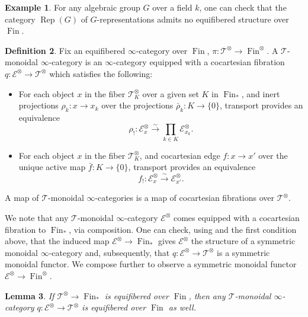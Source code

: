 \documentclass[reqno]{amsart}
\newtheorem{lemma}{Lemma}[section]
\theoremstyle{definition}
\newtheorem{example}[lemma]{Example}
\newtheorem{definition}[lemma]{Definition}
\newcommand{\msc}[1]{\mathscr{#1}}
\newcommand{\opn}[1]{\operatorname{#1}}
\newcommand{\ot}{\otimes}
\DeclareMathOperator{\Fin}{Fin}
\renewcommand{\1}{\mathbf{1}}
\begin{document}
\begin{example}
For any algebraic group $G$ over a field $k$, one can check that the category $\opn{Rep}(G)$ of $G$-representations admits no equifibered structure over $\Fin$.
\end{example}

\begin{definition}\label{def:T_mon}
Fix an equifibered $\infty$-category over $\Fin$, $\pi:\msc{T}^{\ot}\to \Fin^{\ot}$. A $\msc{T}$-monoidal $\infty$-category is an $\infty$-category equipped with a cocartesian fibration $q:\msc{E}^{\ot}\to\msc{T}^{\ot}$ which satisfies the following:
\begin{itemize}
\item For each object $x$ in the fiber $\msc{T}^{\ot}_K$ over a given set $K$ in $\opn{Fin}_{\ast}$, and inert projections $\rho_k:x\to x_k$ over the projections $\bar{\rho}_k:K\to \{0\}$, transport provides an equivalence
\[
\rho_!:\msc{E}^{\ot}_x\overset{\sim}\to \prod_{k\in K} \msc{E}^{\ot}_{x_k}.
\]\vspace{1mm}
\item For each object $x$ in the fiber $\msc{T}^{\ot}_K$, and cocartesian edge $f:x\to x'$ over the unique active map $\bar{f}:K\to \{0\}$, transport provides an equivalence
\[
f_!:\msc{E}^{\ot}_x\overset{\sim}\to \msc{E}^{\ot}_{x'}.
\]
\end{itemize}
A map of $\msc{T}$-monoidal $\infty$-categories is a map of cocartesian fibrations over $\msc{T}^{\ot}$.
\end{definition}

We note that any $\msc{T}$-monoidal $\infty$-category $\msc{E}^{\ot}$ comes equipped with a cocartesian fibration to $\Fin_{\ast}$, via composition. One can check, using \cite[\href{https://kerodon.net/tag/023M}{023M}]{kerodon} and the first condition above, that the induced map $\msc{E}^{\ot}\to \Fin_{\ast}$ gives $\msc{E}^{\ot}$ the structure of a symmetric monoidal $\infty$-category and, subsequently, that $q:\msc{E}^{\ot}\to \msc{T}^{\ot}$ is a symmetric monoidal functor. We compose further to observe a symmetric monoidal functor $\msc{E}^{\ot}\to \opn{Fin}^{\ot}$.

\begin{lemma}
If $\msc{T}^{\ot}\to \Fin_{\ast}$ is equifibered over $\opn{Fin}$, then any $\msc{T}$-monoidal $\infty$-category $q:\msc{E}^{\ot}\to \msc{T}^{\ot}$ is equifibered over $\opn{Fin}$ as well.
\end{lemma}
\end{document}
